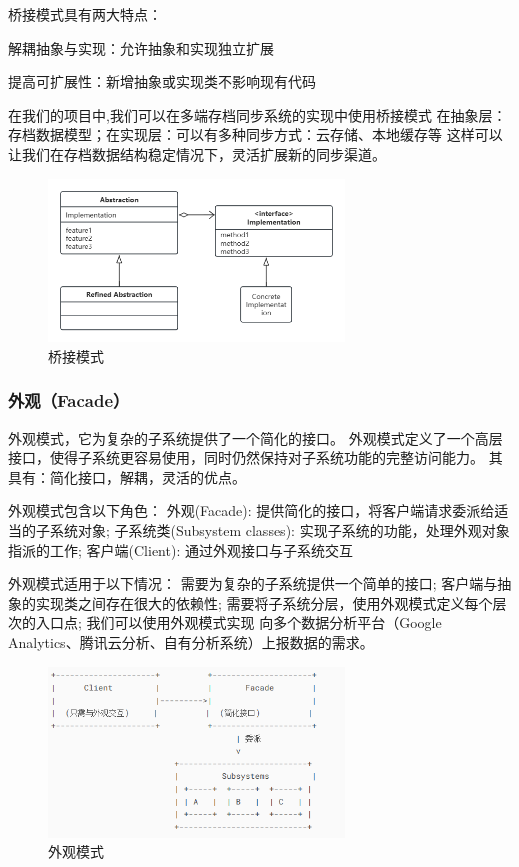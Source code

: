 \documentclass[12pt]{ctexart} %
\begin{document}
桥接模式具有两大特点：

解耦抽象与实现：允许抽象和实现独立扩展

提高可扩展性：新增抽象或实现类不影响现有代码

在我们的项目中,我们可以在多端存档同步系统的实现中使用桥接模式
在抽象层：存档数据模型；在实现层：可以有多种同步方式：云存储、本地缓存等
这样可以让我们在存档数据结构稳定情况下，灵活扩展新的同步渠道。
\begin{figure}[H]
  \centering
  \includegraphics[width=0.7\textwidth]{qiaojie.png}
  \caption{桥接模式}
\end{figure}
\subsubsection{外观（Facade）} 
外观模式，它为复杂的子系统提供了一个简化的接口。
外观模式定义了一个高层接口，使得子系统更容易使用，同时仍然保持对子系统功能的完整访问能力。
其具有：简化接口，解耦，灵活的优点。

外观模式包含以下角色：
外观(Facade): 提供简化的接口，将客户端请求委派给适当的子系统对象;
子系统类(Subsystem classes): 实现子系统的功能，处理外观对象指派的工作;
客户端(Client): 通过外观接口与子系统交互

外观模式适用于以下情况：
需要为复杂的子系统提供一个简单的接口;
客户端与抽象的实现类之间存在很大的依赖性;
需要将子系统分层，使用外观模式定义每个层次的入口点;
我们可以使用外观模式实现
向多个数据分析平台（Google Analytics、腾讯云分析、自有分析系统）上报数据的需求。

\begin{figure}[H]
  \centering
  \includegraphics[width=0.7\textwidth]{waiguan.png}
  \caption{外观模式}
\end{figure}
\end{document}
